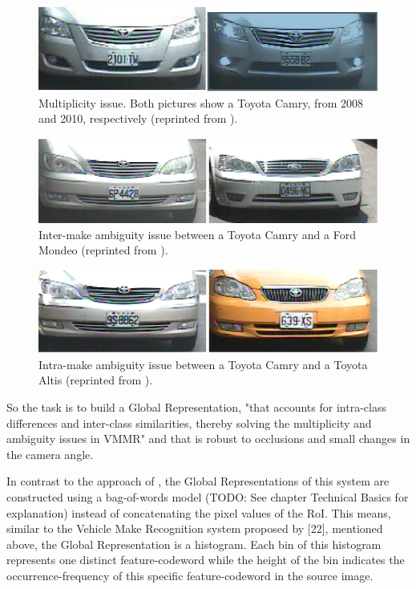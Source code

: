 \begin{figure}[bth]
  \centering
        \includegraphics[width=.75\linewidth]{gfx/multiplicity_reprint}
        \caption{Multiplicity issue. Both pictures show a Toyota Camry, from 2008 and 2010, respectively (reprinted from \citep{siddiqui2015robust}).}
        \label{fig:vmmrMultiplicity}
\end{figure}
\begin{figure}[bth]
  \centering
        \includegraphics[width=.75\linewidth]{gfx/ambiguity_intermake_reprint}
        \caption{Inter-make ambiguity issue between a Toyota Camry and a Ford Mondeo (reprinted from \citep{siddiqui2015robust}).}
        \label{fig:vmmrAmbiguityInterMake}
\end{figure}
\begin{figure}[bth]
  \centering
        \includegraphics[width=.75\linewidth]{gfx/ambiguity_intramake_reprint}
        \caption{Intra-make ambiguity issue between a Toyota Camry and a Toyota Altis (reprinted from \citep{siddiqui2015robust}).}
        \label{fig:vmmrAmbiguityIntraMake}
\end{figure}

So the task is to build a Global Representation, "that accounts for intra-class differences and inter-class similarities, thereby solving the multiplicity and ambiguity issues in VMMR" \citep{siddiqui2015robust} and that is robust to occlusions and small changes in the camera angle.

In contrast to the approach of \citeauthor{petrovic2004analysis}, the Global Representations of this system are constructed using a bag-of-words model (TODO: See chapter Technical Basics for explanation) instead of concatenating the pixel values of the RoI. This means, similar to the Vehicle Make Recognition system proposed by [22], mentioned above, the Global Representation is a histogram. Each bin of this histogram represents one distinct feature-codeword while the height of the bin indicates the occurrence-frequency of this specific feature-codeword in the source image.

